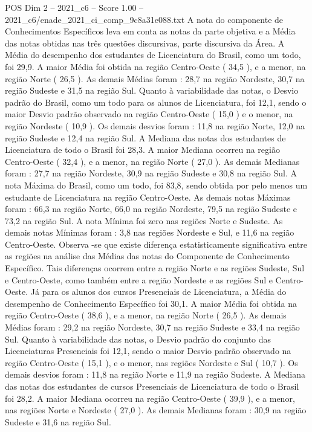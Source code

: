 \begin{textsample}{POS Dim 2 – 2021\_c6 – Score 1.00 – 2021\_c6/enade\_2021\_ci\_comp\_9c8a31e088.txt}
A nota do componente de Conhecimentos Específicos leva em conta as notas da parte objetiva e a Média das notas obtidas nas três questões discursivas, parte discursiva da Área.
A Média do desempenho dos estudantes de Licenciatura do Brasil, como um todo, foi 29,9.
A maior Média foi obtida na região Centro-Oeste ( 34,5 ), e a menor, na região Norte ( 26,5 ).
As demais Médias foram : 28,7 na região Nordeste, 30,7 na região Sudeste e 31,5 na região Sul.
Quanto à variabilidade das notas, o Desvio padrão do Brasil, como um todo para os alunos de Licenciatura, foi 12,1, sendo o maior Desvio padrão observado na região Centro-Oeste ( 15,0 ) e o menor, na região Nordeste ( 10,9 ).
Os demais desvios foram : 11,8 na região Norte, 12,0 na região Sudeste e 12,4 na região Sul.
A Mediana das notas dos estudantes de Licenciatura de todo o Brasil foi 28,3.
A maior Mediana ocorreu na região Centro-Oeste ( 32,4 ), e a menor, na região Norte ( 27,0 ).
As demais Medianas foram : 27,7 na região Nordeste, 30,9 na região Sudeste e 30,8 na região Sul.
A nota Máxima do Brasil, como um todo, foi 83,8, sendo obtida por pelo menos um estudante de Licenciatura na região Centro-Oeste.
As demais notas Máximas foram : 66,3 na região Norte, 66,0 na região Nordeste, 79,5 na região Sudeste e 73,2 na região Sul.
A nota Mínima foi zero nas regiões Norte e Sudeste.
As demais notas Mínimas foram : 3,8 nas regiões Nordeste e Sul, e 11,6 na região Centro-Oeste.
Observa -se que existe diferença estatisticamente significativa entre as regiões na análise das Médias das notas do Componente de Conhecimento Específico.
Tais diferenças ocorrem entre a região Norte e as regiões Sudeste, Sul e Centro-Oeste, como também entre a região Nordeste e as regiões Sul e Centro-Oeste.
Já para os alunos dos cursos Presenciais de Licenciatura, a Média do desempenho de Conhecimento Específico foi 30,1.
A maior Média foi obtida na região Centro-Oeste ( 38,6 ), e a menor, na região Norte ( 26,5 ).
As demais Médias foram : 29,2 na região Nordeste, 30,7 na região Sudeste e 33,4 na região Sul.
Quanto à variabilidade das notas, o Desvio padrão do conjunto das Licenciaturas Presenciais foi 12,1, sendo o maior Desvio padrão observado na região Centro-Oeste ( 15,1 ), e o menor, nas regiões Nordeste e Sul ( 10,7 ).
Os demais desvios foram : 11,8 na região Norte e 11,9 na região Sudeste.
A Mediana das notas dos estudantes de cursos Presenciais de Licenciatura de todo o Brasil foi 28,2.
A maior Mediana ocorreu na região Centro-Oeste ( 39,9 ), e a menor, nas regiões Norte e Nordeste ( 27,0 ).
As demais Medianas foram : 30,9 na região Sudeste e 31,6 na região Sul.

\end{textsample}
